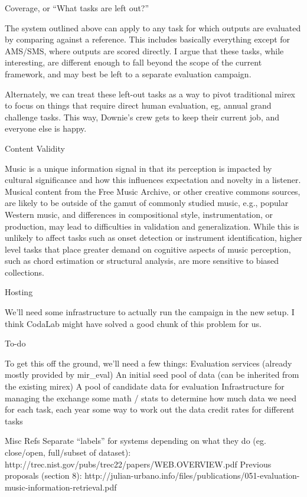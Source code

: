 \documentclass{article}
\begin{document}
Coverage, or “What tasks are left out?”

The system outlined above can apply to any task for which outputs are evaluated by comparing against a reference.  This includes basically everything except for AMS/SMS, where outputs are scored directly.  I argue that these tasks, while interesting, are different enough to fall beyond the scope of the current framework, and may best be left to a separate evaluation campaign.

Alternately, we can treat these left-out tasks as a way to pivot traditional mirex to focus on things that require direct human evaluation, eg, annual grand challenge tasks.  This way, Downie’s crew gets to keep their current job, and everyone else is happy.

Content Validity

Music is a unique information signal in that its perception is impacted by cultural significance and how this influences expectation and novelty in a listener. Musical content from the Free Music Archive, or other creative commons sources, are likely to be outside of the gamut of commonly studied music, e.g., popular Western music, and differences in compositional style, instrumentation, or production, may lead to difficulties in validation and generalization. While this is unlikely to affect tasks such as onset detection or instrument identification, higher level tasks that place greater demand on cognitive aspects of music perception, such as chord estimation or structural analysis, are more sensitive to biased collections. 

Hosting

We’ll need some infrastructure to actually run the campaign in the new setup.  I think CodaLab might have solved a good chunk of this problem for us.

To-do

To get this off the ground, we’ll need a few things:
Evaluation services (already mostly provided by mir\_eval)
An initial seed pool of data (can be inherited from the existing mirex)
A pool of candidate data for evaluation
Infrastructure for managing the exchange
some math / stats to determine how much data we need for each task, each year
some way to work out the data credit rates for different tasks

Misc Refs
Separate “labels” for systems depending on what they do (eg. close/open, full/subset of dataset): http://trec.nist.gov/pubs/trec22/papers/WEB.OVERVIEW.pdf 
Previous proposals (section 8): http://julian-urbano.info/files/publications/051-evaluation-music-information-retrieval.pdf



\end{document}
